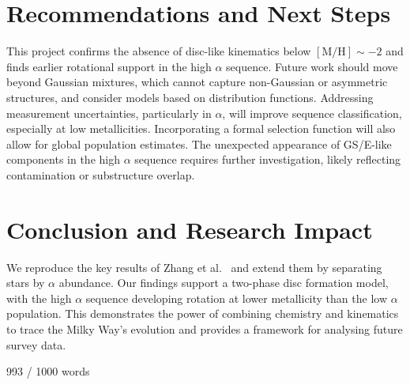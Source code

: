 \documentclass[a4paper,10pt]{article}
\begin{document}
\begin{multicols}{2}
\section*{Recommendations and Next Steps}

This project confirms the absence of disc-like kinematics below $\mathrm{[M/H]} \sim -2$ 
and finds earlier rotational support in the high $\alpha$ sequence. Future work should move 
beyond Gaussian mixtures, which cannot capture non-Gaussian or asymmetric structures, and 
consider models based on distribution functions. Addressing measurement uncertainties, 
particularly in $\alpha$, will improve sequence classification, especially 
at low metallicities. Incorporating a formal selection function will also allow for global 
population estimates. The unexpected appearance of GS/E-like components in the high $\alpha$ 
sequence requires further investigation, likely reflecting contamination or substructure overlap.

\section*{Conclusion and Research Impact}

We reproduce the key results of Zhang et al.~ \cite{zhang2024existencemetalpoordiscmilky} and 
extend them by separating stars by $\alpha$ abundance. Our findings support a two-phase disc 
formation model, with the high $\alpha$ sequence developing rotation at lower metallicity than 
the low $\alpha$ population. This demonstrates the power of combining chemistry and kinematics to 
trace the Milky Way’s evolution and provides a framework for analysing future survey data.

\newpage{}

993 / 1000 words








  


\end{multicols}
\end{document}
